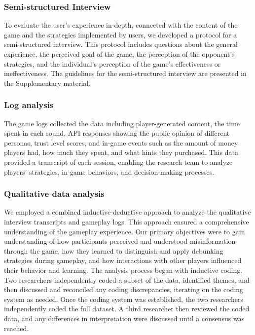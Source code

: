 \subsubsection{Semi-structured Interview}

To evaluate the user's experience in-depth, connected with the content of the game and the strategies implemented by users, we developed a protocol for a semi-structured interview. This protocol includes questions about the general experience, the perceived goal of the game, the perception of the opponent's strategies, and the individual's perception of the game's effectiveness or ineffectiveness. The guidelines for the semi-structured interview are presented in the Supplementary material.

\subsubsection{Log analysis}
The game logs collected the data including player-generated content, the time spent in each round, API responses showing the public opinion of different personas, trust level scores, and in-game events such as the amount of money players had, how much they spent, and what hints they purchased. This data provided a %
transcript of each session, enabling the research team to analyze players’ strategies, in-game behaviors, and decision-making processes.
\subsubsection{Qualitative data analysis}
We employed a combined inductive-deductive approach to analyze the qualitative interview transcripts and gameplay logs\cite{kuckartz2019analyzing}. This approach ensured a comprehensive understanding of the gameplay experience. Our primary objectives were to gain understanding of how participants perceived and understood misinformation through the game, how they learned to distinguish and apply debunking strategies during gameplay, and how interactions with other players influenced their behavior and learning. The analysis process began with inductive coding. Two researchers independently coded a subset of the data, identified themes, and then discussed and reconciled any coding discrepancies, iterating on the coding system as needed. Once the coding system was established, the two researchers independently coded the full dataset. A third researcher then reviewed the coded data, and any differences in interpretation were discussed until a consensus was reached.
